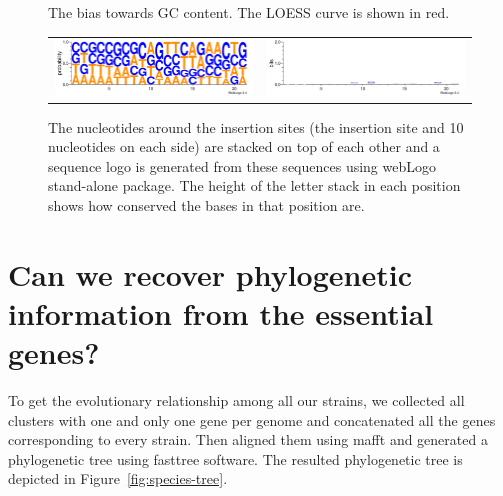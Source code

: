 \documentclass[a4paper,10pt, twocolumn]{article}
\begin{document}
\begin{figure}
\begin{tabular}{c c}
\end{tabular}
\caption{The bias towards GC content. The LOESS curve is shown in red.}
\label{fig:GC_bias}
\end{figure}

\begin{figure}
\centering
\begin{tabular}{c c}
\includegraphics[scale=.98, angle = -90]{logos/logo-prob.pdf} &
\includegraphics[scale=.98, angle = -90]{logos/logo-bits.pdf}
\end{tabular}
\caption{The nucleotides around the insertion sites (the insertion site and 10 nucleotides on each side) are stacked on top of each other and a sequence logo is generated from these sequences using webLogo stand-alone package. The height of the letter stack in each position shows how conserved the bases in that position are.}
\label{fig:logo}
\end{figure}

\section{Can we recover phylogenetic information from the essential genes?}
To get the evolutionary relationship among all our strains, we collected all clusters with one and only one gene per genome and concatenated all the genes corresponding to every strain. Then aligned them using mafft and generated a phylogenetic tree using fasttree software. The resulted phylogenetic tree is depicted in Figure~\ref{fig:species-tree}.
\end{document}
